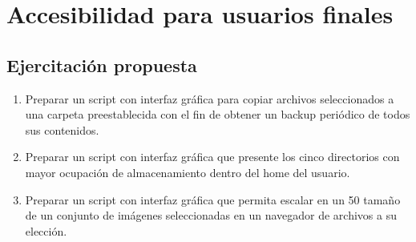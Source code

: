 \section{Accesibilidad para usuarios finales}\label{ref:acces}
\subsection{Ejercitación propuesta}
\begin{enumerate}
	\item 
Preparar un script con interfaz gráfica para copiar archivos seleccionados a una carpeta preestablecida con el fin de obtener un backup periódico de todos sus contenidos.
	\item 
Preparar un script con interfaz gráfica que presente los cinco directorios con mayor ocupación de almacenamiento dentro del home del usuario.
	\item 
Preparar un script con interfaz gráfica que permita escalar en un 50%
tamaño de un conjunto de imágenes seleccionadas en un navegador de archivos
a su elección. 
\end{enumerate}
